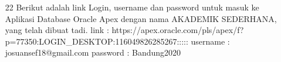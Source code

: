 \begin{enumerate}
\item[22]Berikut adalah link Login, username dan password untuk masuk ke Aplikasi Database Oracle Apex dengan nama AKADEMIK SEDERHANA, yang telah dibuat tadi.
link : https://apex.oracle.com/pls/apex/f?p=77350:LOGIN_DESKTOP:116049826285267:::::
username : josuansef18@gmail.com
password : Bandung2020

   

\end{enumerate}
